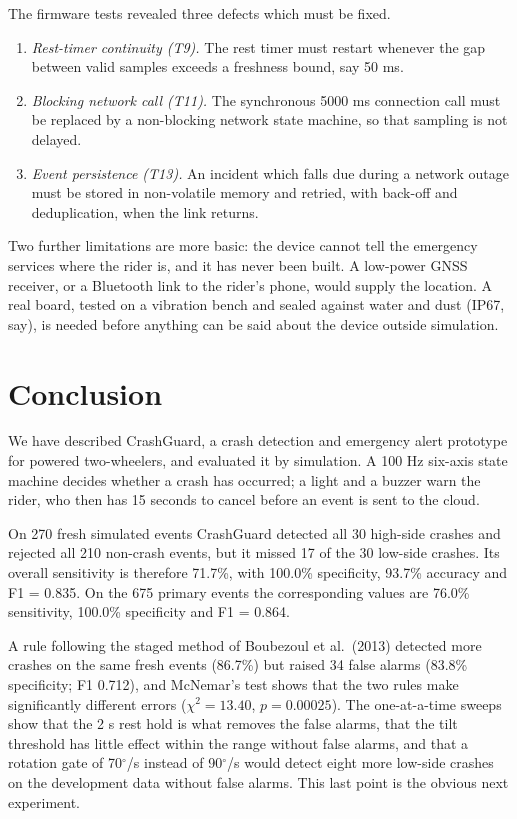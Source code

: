\documentclass[10pt,a4paper]{article}
\newcommand{\degree}{\ensuremath{^{\circ}}}
\begin{document}
The firmware tests revealed three defects which must be fixed.
\begin{enumerate}
\item \textit{Rest-timer continuity (T9).} The rest timer must restart whenever the gap between valid samples exceeds a freshness bound, say 50 ms.
\item \textit{Blocking network call (T11).} The synchronous 5000 ms connection call must be replaced by a non-blocking network state machine, so that sampling is not delayed.
\item \textit{Event persistence (T13).} An incident which falls due during a network outage must be stored in non-volatile memory and retried, with back-off and deduplication, when the link returns.
\end{enumerate}

Two further limitations are more basic: the device cannot tell the emergency services where the rider is, and it has never been built. A low-power GNSS receiver, or a Bluetooth link to the rider's phone, would supply the location. A real board, tested on a vibration bench and sealed against water and dust (IP67, say), is needed before anything can be said about the device outside simulation.

\section{Conclusion}
We have described CrashGuard, a crash detection and emergency alert prototype for powered two-wheelers, and evaluated it by simulation. A 100 Hz six-axis state machine decides whether a crash has occurred; a light and a buzzer warn the rider, who then has 15 seconds to cancel before an event is sent to the cloud.

On 270 fresh simulated events CrashGuard detected all 30 high-side crashes and rejected all 210 non-crash events, but it missed 17 of the 30 low-side crashes. Its overall sensitivity is therefore 71.7\%, with 100.0\% specificity, 93.7\% accuracy and F1 = 0.835. On the 675 primary events the corresponding values are 76.0\% sensitivity, 100.0\% specificity and F1 = 0.864.

A rule following the staged method of Boubezoul et al.\ (2013) detected more crashes on the same fresh events (86.7\%) but raised 34 false alarms (83.8\% specificity; F1 0.712), and McNemar's test shows that the two rules make significantly different errors ($\chi^2=13.40$, $p=0.00025$). The one-at-a-time sweeps show that the 2 s rest hold is what removes the false alarms, that the tilt threshold has little effect within the range without false alarms, and that a rotation gate of 70$\degree$/s instead of 90$\degree$/s would detect eight more low-side crashes on the development data without false alarms. This last point is the obvious next experiment.
\end{document}
